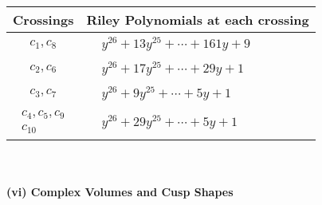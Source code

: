 \documentclass[1p]{elsarticle_modified}
\theoremstyle{definition}
\begin{document}
\begin{tabular}{m{50pt}|m{274pt}}
Crossings & \hspace{64pt}Riley Polynomials at each crossing \\
\hline $$\begin{aligned}c_{1},c_{8}\end{aligned}$$&$\begin{aligned}
&y^{26}+13 y^{25}+\cdots+161 y+9
\end{aligned}$\\
\hline $$\begin{aligned}c_{2},c_{6}\end{aligned}$$&$\begin{aligned}
&y^{26}+17 y^{25}+\cdots+29 y+1
\end{aligned}$\\
\hline $$\begin{aligned}c_{3},c_{7}\end{aligned}$$&$\begin{aligned}
&y^{26}+9 y^{25}+\cdots+5 y+1
\end{aligned}$\\
\hline $$\begin{aligned}c_{4},c_{5},c_{9}\\c_{10}\end{aligned}$$&$\begin{aligned}
&y^{26}+29 y^{25}+\cdots+5 y+1
\end{aligned}$\\
\hline
\end{tabular}\\~\\
\newpage\flushleft \textbf{(vi) Complex Volumes and Cusp Shapes}
\end{document}
